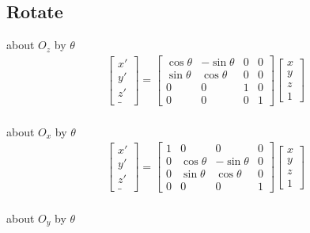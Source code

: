 \documentclass{article}
\begin{document}
\subsection{Rotate}\label{rotations}
about $O_z$
by $\theta$
\begin{gather}
		\begin{bmatrix}
		x'\\
		y'\\
		z'\\
		\_
	\end{bmatrix}
	=
	\begin{bmatrix}
		\cos \theta & -\sin \theta & 0 & 0\\
		\sin \theta &  \cos \theta & 0 & 0\\
		0           & 0            & 1 & 0\\
		0           & 0            & 0 & 1
	\end{bmatrix}
	\begin{bmatrix}
		x\\
		y\\
		z\\
		1
	\end{bmatrix}
\end{gather}
\\
about $O_x$
by $\theta$
\begin{gather}
		\begin{bmatrix}
		x'\\
		y'\\
		z'\\
		\_
	\end{bmatrix}
	=
	\begin{bmatrix}
		1 & 0           & 0            & 0\\
		0 & \cos \theta & -\sin \theta & 0\\
		0 & \sin \theta &  \cos \theta & 0\\
		0 & 0           &  0           & 1
	\end{bmatrix}
	\begin{bmatrix}
		x\\
		y\\
		z\\
		1
	\end{bmatrix}
\end{gather}
\\
about $O_y$
by $\theta$
\end{document}
